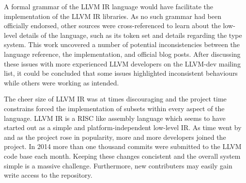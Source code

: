 

A formal grammar of the LLVM IR language would have facilitate the implementation of the LLVM IR libraries. As no such grammar had been officially endorsed, other sources were cross-referenced to learn about the low-level details of the language, such as its token set and details regarding the type system. This work uncovered a number of potential inconsistencies between the language reference, the implementation, and official blog posts. After discussing these issues with more experienced LLVM developers on the LLVM-dev mailing list, it could be concluded that some issues highlighted inconsistent behaviours while others were working as intended.

The cheer size of LLVM IR was at times discouraging and the project time constrains forced the implementation of subsets within every aspect of the language. LLVM IR is a RISC like assembly language which seems to have started out as a simple and platform-independent low-level IR. As time went by and as the project rose in popularity, more and more developers joined the project. In 2014 more than one thousand commits were submitted to the LLVM code base each month. Keeping these changes concistent and the overall system simple is a massive challenge. Furthermore, new contributers may easily gain write access to the repository.





